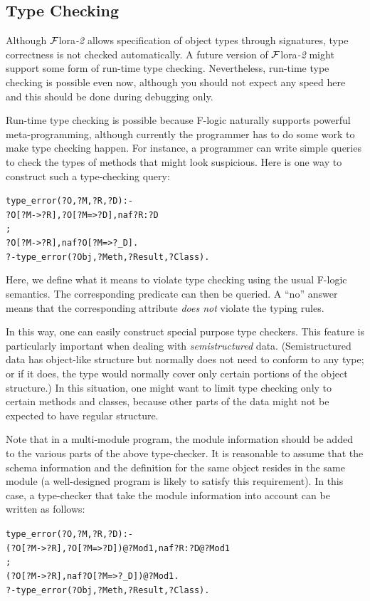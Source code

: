 \documentclass[11pt]{article}
\newcommand{\FLORA}{{\mbox{\sc ${\cal F}${lora}\rm\emph{-2}}}\xspace}
\newcommand{\fl}{\mbox{F-logic}\xspace}
\newcommand{\RULELOGNAF}{{{\tt naf}}\xspace}
\begin{document}
\subsection{Type Checking}\label{sec-typechecking}

Although \FLORA allows specification of object types through signatures,
type correctness is not checked automatically.
A future version of \FLORA might support some form of run-time type
checking. Nevertheless, run-time type checking is possible even now,
although you should not expect any speed here and this should be done
during debugging only.

Run-time type checking is possible because \fl naturally supports powerful
meta-programming, although currently the programmer has to do some work to
make type checking happen.  For instance, a programmer can write simple
queries to check the types of methods that might look suspicious.  Here is
one way to construct such a type-checking query:
\begin{alltt}
type_error(?O,?M,?R,?D) :-
       ?O[?M->?R], ?O[?M=>?D], \RULELOGNAF ?R:?D
       ;
       ?O[?M->?R], \RULELOGNAF ?O[?M=>?_D].
?- type_error(?Obj,?Meth,?Result,?Class).
\end{alltt}
Here, we define what it means to violate type checking using the usual
\fl semantics. The corresponding predicate can then be queried. A
``no'' answer means that the corresponding attribute \emph{does not}
violate the typing rules.

In this way, one can easily construct special purpose type checkers.  This
feature is particularly important when dealing with \emph{semistructured}
data. (Semistructured data has object-like structure but normally does not
need to conform to any type; or if it does, the type would normally cover
only certain portions of the object structure.) In this situation, one
might want to limit type checking only to certain methods and classes,
because other parts of the data might not be expected to have regular
structure.

Note that in a multi-module program, the module information should be added
to the various parts of the above type-checker. It is reasonable to assume
that the schema information and the definition for the same object
resides in the same module (a well-designed program is likely to satisfy
this requirement). In this case, a type-checker that take the module
information into account can be written as follows:
\begin{alltt}
type_error(?O,?M,?R,?D) :-
       (?O[?M->?R], ?O[?M=>?D])@?Mod1, \RULELOGNAF ?R:?D@?Mod1
       ;
       (?O[?M->?R], \RULELOGNAF ?O[?M=>?_D])@?Mod1.
?- type_error(?Obj,?Meth,?Result,?Class).
\end{alltt}
\end{document}
